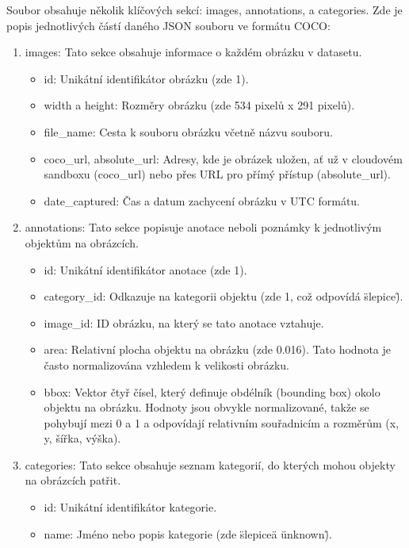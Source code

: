 Soubor obsahuje několik klíčových sekcí: images, annotations, a categories.\newline
Zde je popis jednotlivých částí daného JSON souboru ve formátu COCO:
\begin{enumerate}
    \item images: Tato sekce obsahuje informace o každém obrázku v datasetu.
    \begin{itemize}
        \item id: Unikátní identifikátor obrázku (zde 1).
        \item width a height: Rozměry obrázku (zde 534 pixelů x 291 pixelů).
        \item file\_name: Cesta k souboru obrázku včetně názvu souboru.
        \item coco\_url, absolute\_url: Adresy, kde je obrázek uložen, ať už v cloudovém sandboxu (coco\_url) nebo přes URL pro přímý přístup (absolute\_url).
        \item date\_captured: Čas a datum zachycení obrázku v UTC formátu.
    \end{itemize}
    \item annotations: Tato sekce popisuje anotace neboli poznámky k jednotlivým objektům na obrázcích.
    \begin{itemize}
        \item id: Unikátní identifikátor anotace (zde 1).
        \item category\_id: Odkazuje na kategorii objektu (zde 1, což odpovídá \"slepice\").
        \item image\_id: ID obrázku, na který se tato anotace vztahuje.
        \item area: Relativní plocha objektu na obrázku (zde 0.016).
        Tato hodnota je často normalizována vzhledem k velikosti obrázku.
        \item bbox: Vektor čtyř čísel, který definuje obdélník (bounding box) okolo objektu na obrázku.
        Hodnoty jsou obvykle normalizované, takže se pohybují mezi 0 a 1 a odpovídají relativním souřadnicím a rozměrům (x, y, šířka, výška).
    \end{itemize}
    \item categories: Tato sekce obsahuje seznam kategorií, do kterých mohou objekty na obrázcích patřit.
    \begin{itemize}
        \item id: Unikátní identifikátor kategorie.
        \item name: Jméno nebo popis kategorie (zde \"slepice\" a \"unknown\").
    \end{itemize}
\end{enumerate}

